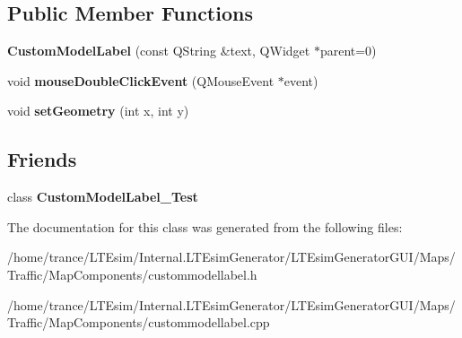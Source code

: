 \subsection*{Public Member Functions}
\begin{DoxyCompactItemize}
\item 
{\bfseries Custom\+Model\+Label} (const Q\+String \&text, Q\+Widget $\ast$parent=0)\hypertarget{class_custom_model_label_a4c14caab17949fb520c81f5940bec2d2}{}\label{class_custom_model_label_a4c14caab17949fb520c81f5940bec2d2}

\item 
void {\bfseries mouse\+Double\+Click\+Event} (Q\+Mouse\+Event $\ast$event)\hypertarget{class_custom_model_label_ac5465f245d0441c93c18d28d46409023}{}\label{class_custom_model_label_ac5465f245d0441c93c18d28d46409023}

\item 
void {\bfseries set\+Geometry} (int x, int y)\hypertarget{class_custom_model_label_a0dd26f37684ad520b4f848748c29d1c0}{}\label{class_custom_model_label_a0dd26f37684ad520b4f848748c29d1c0}

\end{DoxyCompactItemize}
\subsection*{Friends}
\begin{DoxyCompactItemize}
\item 
class {\bfseries Custom\+Model\+Label\+\_\+\+Test}\hypertarget{class_custom_model_label_a43ccaa3a8c63e19ea328e17f499ec200}{}\label{class_custom_model_label_a43ccaa3a8c63e19ea328e17f499ec200}

\end{DoxyCompactItemize}


The documentation for this class was generated from the following files\+:\begin{DoxyCompactItemize}
\item 
/home/trance/\+L\+T\+Esim/\+Internal.\+L\+T\+Esim\+Generator/\+L\+T\+Esim\+Generator\+G\+U\+I/\+Maps/\+Traffic/\+Map\+Components/custommodellabel.\+h\item 
/home/trance/\+L\+T\+Esim/\+Internal.\+L\+T\+Esim\+Generator/\+L\+T\+Esim\+Generator\+G\+U\+I/\+Maps/\+Traffic/\+Map\+Components/custommodellabel.\+cpp\end{DoxyCompactItemize}
